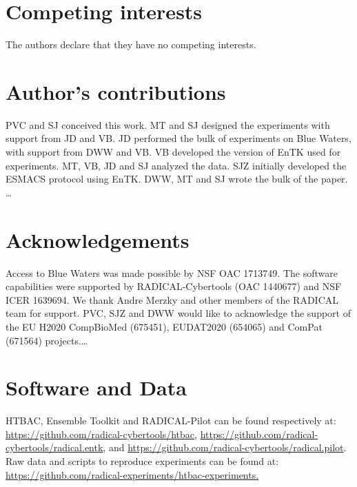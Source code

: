 \documentclass{bmcart}
\begin{document}
\begin{backmatter}

\section*{Competing interests}
The authors declare that they have no competing interests.

\section*{Author's contributions}
PVC and SJ conceived this work. MT and SJ
designed the experiments with support from JD and VB. JD performed the bulk of
experiments on Blue Waters, with support from DWW and VB. VB developed the
version of EnTK used for experiments. MT, VB, JD and SJ analyzed the data. SJZ
initially developed the ESMACS protocol using EnTK. DWW, MT and SJ wrote the
bulk of the paper. \ldots

\section*{Acknowledgements}
Access to Blue Waters was made possible by NSF OAC 1713749. The software
capabilities were supported by RADICAL-Cybertools (OAC 1440677) and NSF ICER
1639694. We thank Andre Merzky and other members of the RADICAL team for
support. PVC, SJZ and DWW would like to acknowledge the support of the EU
H2020 CompBioMed (675451), EUDAT2020 (654065) and ComPat (671564) projects.\ldots

\section*{Software and Data}
HTBAC, Ensemble Toolkit and
RADICAL-Pilot can be found respectively at:
\url{https://github.com/radical-cybertools/htbac},
\url{https://github.com/radical-cybertools/radical.entk}, and
\url{https://github.com/radical-cybertools/radical.pilot}. Raw data and
scripts to reproduce experiments can be found at:
\url{https://github.com/radical-experiments/htbac-experiments.}

\end{backmatter}



\end{document}
